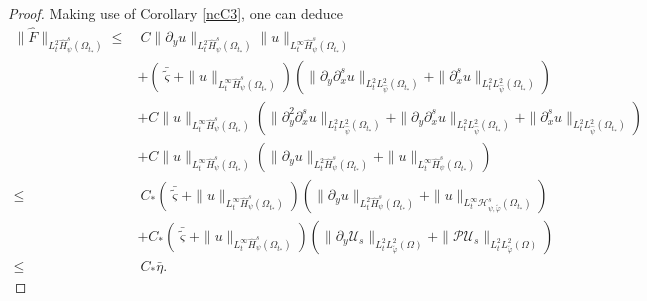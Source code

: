 \documentclass{amsart}
\numberwithin{equation}{section}
\begin{document}
\begin{proof}
Making use of Corollary \ref{ncC3}, one can deduce
\begin{align}\label{FL2Hs}
\|\hat{F}\|_{L_{t}^{2}\hat{H}_{\psi}^{s}(\Omega_{t_{*}})}
\leq&~C\|\partial_{y}u\|_{L_{t}^{2}\hat{H}_{\psi}^{s}(\Omega_{t_{*}})}\|u\|_{L_{t}^{\infty}\hat{H}_{\psi}^{s}(\Omega_{t_{*}})}\\
    &+\left(\bar{\tilde{\varsigma}}+\|u\|_{L_{t}^{\infty}\hat{H}_{\psi}^{s}(\Omega_{t_{*}})}\right)
      \left(\|\partial_{y}\partial_{x}^{s}u\|_{L_{t}^{2}L_{\hat{\psi}}^{2}(\Omega_{t_{*}})}+\|\partial_{x}^{s}u\|_{L_{t}^{2}L_{\hat{\psi}}^{2}(\Omega_{t_{*}})}\right)\nonumber\\
    &+C\|u\|_{L_{t}^{\infty}\hat{H}_{\psi}^{s}(\Omega_{t_{*}})}\left(\|\partial_{y}^{2}\partial_{x}^{s}u\|_{L_{t}^{2}L_{\hat{\psi}}^{2}(\Omega_{t_{*}})}
                            +\|\partial_{y}\partial_{x}^{s}u\|_{L_{t}^{2}L_{\hat{\psi}}^{2}(\Omega_{t_{*}})}
                            +\|\partial_{x}^{s}u\|_{L_{t}^{2}L_{\hat{\psi}}^{2}(\Omega_{t_{*}})}\right)\nonumber\\
    &+C\|u\|_{L_{t}^{\infty}\hat{H}_{\psi}^{s}(\Omega_{t_{*}})}\left(\|\partial_{y}u\|_{L_{t}^{2}\hat{H}_{\psi}^{s}(\Omega_{t_{*}})}
                            +\|u\|_{L_{t}^{\infty}\hat{H}_{\psi}^{s}(\Omega_{t_{*}})}\right)\nonumber\\
\leq&~C_{*}\left(\bar{\tilde{\varsigma}}+\|u\|_{L_{t}^{\infty}\hat{H}_{\psi}^{s}(\Omega_{t_{*}})}\right)
           \left(\|\partial_{y}u\|_{L_{t}^{2}\hat{H}_{\psi}^{s}(\Omega_{t_{*}})}
                 +\|u\|_{L_{t}^{\infty}\mathcal{H}_{\psi,\tilde{\varphi}}^{s}(\Omega_{t_{*}})}\right)\nonumber\\
    &+C_{*}\left(\bar{\tilde{\varsigma}}+\|u\|_{L_{t}^{\infty}\hat{H}_{\psi}^{s}(\Omega_{t_{*}})}\right)
           \left(\|\partial_{y}\mathcal{U}_{s}\|_{L_{t}^{2}L_{\tilde{\varphi}}^{2}(\Omega)}
                 +\|\mathcal{P}\mathcal{U}_{s}\|_{L_{t}^{2}L_{\tilde{\varphi}}^{2}(\Omega)}\right)\nonumber\\
\leq&~C_{*}\bar{\eta}.\nonumber
\end{align}


\end{proof}
\end{document}
